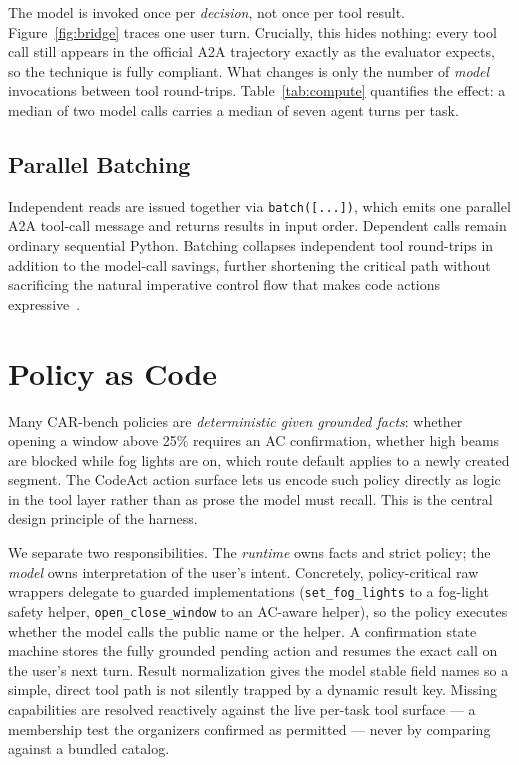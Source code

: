 \documentclass{article}
\begin{document}
The model is invoked once per \emph{decision}, not once per tool result.
Figure~\ref{fig:bridge} traces one user turn.
Crucially, this hides nothing: every tool call still appears in the official
A2A trajectory exactly as the evaluator expects, so the technique is fully
compliant. What changes is only the number of \emph{model} invocations between
tool round-trips. Table~\ref{tab:compute} quantifies the effect: a median of
two model calls carries a median of seven agent turns per task.

\subsection{Parallel Batching}

Independent reads are issued together via \texttt{batch([...])}, which emits one
parallel A2A tool-call message and returns results in input order. Dependent
calls remain ordinary sequential Python. Batching collapses independent tool
round-trips in addition to the model-call savings, further shortening the
critical path without sacrificing the natural imperative control flow that
makes code actions expressive~\cite{wang2024codeact}.

\section{Policy as Code}

Many CAR-bench policies are \emph{deterministic given grounded facts}: whether
opening a window above 25\% requires an AC confirmation, whether high beams are
blocked while fog lights are on, which route default applies to a newly created
segment. The CodeAct action surface lets us encode such policy directly as
logic in the tool layer rather than as prose the model must recall. This is the
central design principle of the harness.

We separate two responsibilities. The \emph{runtime} owns facts and strict
policy; the \emph{model} owns interpretation of the user's intent. Concretely,
policy-critical raw wrappers delegate to guarded implementations
(\texttt{set\_fog\_lights} to a fog-light safety helper,
\texttt{open\_close\_window} to an AC-aware helper), so the policy executes
whether the model calls the public name or the helper. A confirmation state
machine stores the fully grounded pending action and resumes the exact call on
the user's next turn. Result normalization gives the model stable field names
so a simple, direct tool path is not silently trapped by a dynamic result key.
Missing capabilities are resolved reactively against the live per-task tool
surface --- a membership test the organizers confirmed as permitted --- never
by comparing against a bundled catalog.
\end{document}
